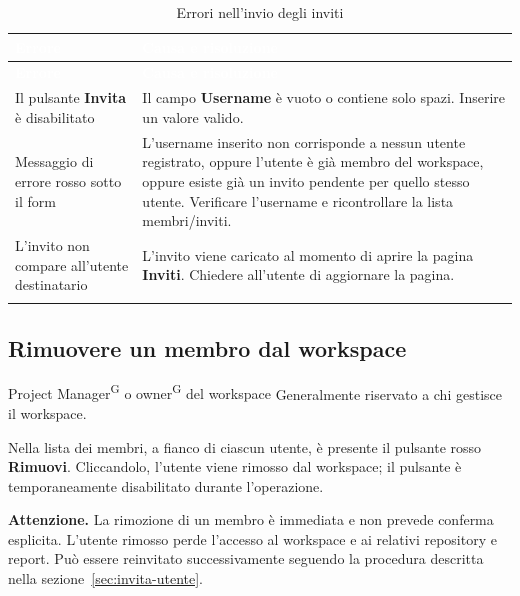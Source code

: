 \documentclass[a4paper, 11pt]{article}
\begin{document}
\begin{longtable}{>{\raggedright\arraybackslash}p{5cm} >{\raggedright\arraybackslash}p{9cm}}
  \rowcolor{AccentColor}
  \textcolor{white}{\textbf{Errore}} &
  \textcolor{white}{\textbf{Causa e risoluzione}} \\
  \endfirsthead

  \rowcolor{AccentColor}
  \textcolor{white}{\textbf{Errore}} &
  \textcolor{white}{\textbf{Causa e risoluzione}} \\
  \endhead

  Il pulsante \textbf{Invita} è disabilitato &
  Il campo \textbf{Username} è vuoto o contiene solo spazi. Inserire un valore valido. \\
  Messaggio di errore rosso sotto il form &
  L'username inserito non corrisponde a nessun utente registrato, oppure l'utente è già membro del workspace, oppure esiste già un invito pendente per quello stesso utente. Verificare l'username e ricontrollare la lista membri/inviti. \\
  L'invito non compare all'utente destinatario &
  L'invito viene caricato al momento di aprire la pagina \textbf{Inviti}. Chiedere all'utente di aggiornare la pagina. \\
\caption{Errori nell'invio degli inviti}
\label{tab:errori-inviti}
\end{longtable}

\subsection{Rimuovere un membro dal workspace}

\begin{rolebox}{Project Manager\textsuperscript{G} o owner\textsuperscript{G} del workspace}
Generalmente riservato a chi gestisce il workspace.
\end{rolebox}

\noindent Nella lista dei membri, a fianco di ciascun utente, è presente il pulsante rosso \textbf{Rimuovi}. Cliccandolo, l'utente viene rimosso dal workspace; il pulsante è temporaneamente disabilitato durante l'operazione.

\begin{warnbox}
\textbf{Attenzione.} La rimozione di un membro è immediata e non prevede conferma esplicita. L'utente rimosso perde l'accesso al workspace e ai relativi repository e report. Può essere reinvitato successivamente seguendo la procedura descritta nella sezione~\ref{sec:invita-utente}.
\end{warnbox}
\end{document}
